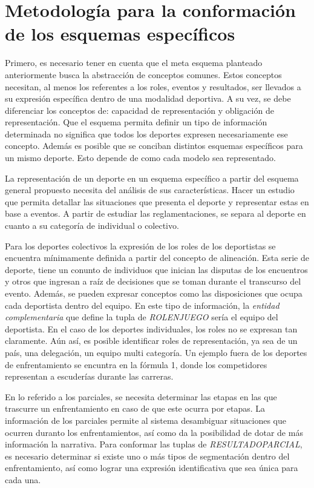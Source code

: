\section{Metodología para la conformación de los esquemas específicos}

    Primero, es necesario tener en cuenta que el meta esquema planteado anteriormente busca la abstracción de conceptos comunes. Estos 
conceptos necesitan, al menos los referentes a los roles, eventos y resultados, ser llevados a su expresión específica dentro de una modalidad 
deportiva. A su vez, se debe diferenciar los conceptos de: capacidad de representación y obligación de representación. Que el esquema permita definir 
un tipo de información determinada no significa que todos los deportes expresen necesariamente ese concepto. Además es posible que se conciban distintos 
esquemas específicos para un mismo deporte. Esto depende de como cada modelo sea representado.

    La representación de un deporte en un esquema específico a partir del esquema general propuesto necesita del análisis de sus características. 
Hacer un estudio que permita detallar las situaciones que presenta el deporte y representar estas en base a eventos. A partir de 
estudiar las reglamentaciones, se separa al deporte en cuanto a su categoría de individual o colectivo. 

    Para los deportes colectivos la expresión de los roles de los deportistas se encuentra mínimamente definida a partir del concepto de 
alineación. Esta serie de deporte, tiene un conunto de individuos que inician las disputas de los encuentros y otros que ingresan a raíz de decisiones 
que se toman durante el transcurso del evento. Además, se pueden expresar conceptos como las disposiciones que ocupa cada deportista dentro del equipo. En este 
tipo de información, la \textit{entidad complementaria} que define la tupla de \textit{ROLENJUEGO} sería el equipo del deportista.
    En el caso de los deportes individuales, los roles no se expresan tan claramente. Aún así, es posible identificar roles de representación, ya sea de un 
país, una delegación, un equipo multi categoría. Un ejemplo fuera de los deportes de enfrentamiento se encuntra en la fórmula 1, donde los competidores 
representan a escuderías durante las carreras.

    En lo referido a los parciales, se necesita determinar las etapas en las que trascurre un enfrentamiento en caso de que este ocurra por etapas. La información 
de los parciales permite al sistema desambiguar situaciones que ocurren duranto los enfrentamientos, así como da la posibilidad de dotar de más información 
la narrativa. Para conformar las tuplas de \textit{RESULTADOPARCIAL}, es necesario determinar si existe uno o m\'as tipos de segmentación dentro del enfrentamiento, así como 
lograr una expresión identificativa que sea única para cada una.

